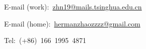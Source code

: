 


E-mail (work):~\href{mailto:zhn19@mails.tsinghua.edu.cn}{zhn19@mails.tsinghua.edu.cn}

E-mail (home):~\href{mailto:hermanzhaozzzz@gmail.com}{hermanzhaozzzz@gmail.com}

Tel:~(+86)~166~1995~4871